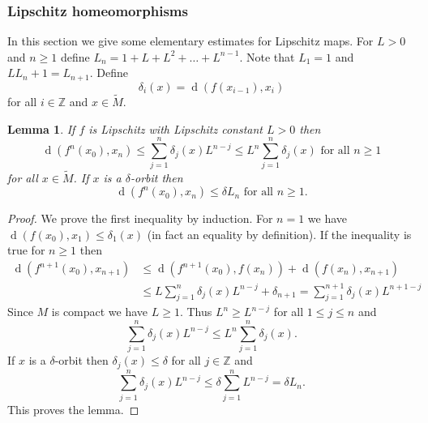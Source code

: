 \documentclass[12pt]{amsart}
\theoremstyle{plain}
\newtheorem{lem}[thm]{Lemma}
\theoremstyle{definition}
\theoremstyle{remark}
\DeclareMathOperator{\dist}{d}
\newcommand{\Z}{\mathbb Z}
\newcommand{\tM}{\tilde{M}}
\begin{document}
\subsubsection{Lipschitz homeomorphisms}
In this section we give some elementary estimates for Lipschitz maps.
For $L>0$ and $n\geq 1$ define $L_n=1+L+L^2+\dots+L^{n-1}$. Note that
$L_1=1$ and $LL_n+1=L_{n+1}$.
Define
$$\delta_i(x)=\dist(f(x_{i-1}),x_i)$$ for all $i\in\Z$ and
$x\in \tM$.

\begin{lem}
	\label{lemShChoto}
	If $f$ is Lipschitz with Lipschitz constant $L>0$
	then
	\begin{equation}
		\label{ecuShChoto2}
		\dist(f^n(x_0),x_n)
		\leq
		\sum_{j=1}^n\delta_j(x)L^{n-j}
		\leq
		L^n\sum_{j=1}^n\delta_j(x)
		\text{ for all }n\geq 1
	\end{equation}
	for all $x\in\tM$.
	If $x$ is a $\delta$-orbit then
	\begin{equation}
	\label{ecuShChoto}
	\dist(f^n(x_0),x_n)\leq\delta L_n\text{ for all }n\geq 1.
\end{equation}
\end{lem}

\begin{proof}
	We prove the first inequality by induction.
	For $n=1$ we have
	$\dist(f(x_0),x_1)\leq\delta_1(x)$ (in fact an equality by definition).
	If the inequality is true for $n\geq 1$ then
	\begin{align*}
		\dist(f^{n+1}(x_0),x_{n+1}) &
		\leq \dist(f^{n+1}(x_0),f(x_n))+\dist(f(x_n),x_{n+1})\\
		&\leq L \sum_{j=1}^n\delta_j(x)L^{n-j} + \delta_{n+1}=\sum_{j=1}^{n+1}\delta_j(x)L^{n+1-j}
	\end{align*}
	Since $M$ is compact we have $L\geq 1$. Thus $L^n\geq L^{n-j}$ for all $1\leq j\leq n$ and
	$$\sum_{j=1}^n\delta_j(x)L^{n-j}
	\leq
	L^n\sum_{j=1}^n\delta_j(x).$$
	If $x$ is a $\delta$-orbit then $\delta_j(x)\leq\delta$ for all $j\in\Z$ and
	$$\sum_{j=1}^n\delta_j(x)L^{n-j}
	\leq
	\delta\sum_{j=1}^nL^{n-j}=\delta L_n.$$
	This proves the lemma.
\end{proof}
\end{document}
